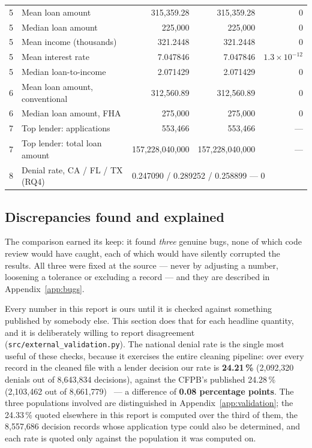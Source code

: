 \documentclass[sigconf,balance=false]{acmart}
\begin{document}
\begin{table}[t]
\begin{tabular}{@{}llrrr@{}}
5 & Mean loan amount                  & 315{,}359.28 & 315{,}359.28 & $0$ \\
5 & Median loan amount                & 225{,}000 & 225{,}000 & $0$ \\
5 & Mean income (thousands)           & 321.2448 & 321.2448 & $0$ \\
5 & Mean interest rate                & 7.047846 & 7.047846 & $1.3{\times}10^{-12}$ \\
5 & Median loan-to-income             & 2.071429 & 2.071429 & $0$ \\
6 & Mean loan amount, conventional    & 312{,}560.89 & 312{,}560.89 & $0$ \\
6 & Median loan amount, FHA           & 275{,}000 & 275{,}000 & $0$ \\
7 & Top lender: applications          & 553{,}466 & 553{,}466 & --- \\
7 & Top lender: total loan amount     & 157{,}228{,}040{,}000 & 157{,}228{,}040{,}000 & --- \\
8 & Denial rate, CA / FL / TX (RQ4)
  & \multicolumn{3}{l}{0.247090 / 0.289252 / 0.258899 --- $0$} \\
\bottomrule
\end{tabular}
\end{table}

\subsection{Discrepancies found and explained}

The comparison earned its keep: it found \emph{three} genuine bugs, none of
which code review would have caught, each of which would have silently
corrupted the results. All three were fixed at the source --- never by
adjusting a number, loosening a tolerance or excluding a record --- and
they are described in Appendix~\ref{app:bugs}.

Every number in this report is ours until it is checked against
something published by somebody else. This section does that for each
headline quantity, and it is deliberately willing to report disagreement
(\texttt{src/external\_\allowbreak validation.py}). The national denial
rate is the single most useful of these checks, because it exercises the
entire cleaning pipeline: over every record in the cleaned file with a
lender decision our rate is \textbf{24.21\,\%} (2{,}092{,}320 denials out
of 8{,}643{,}834 decisions), against the CFPB's published 24.28\,\%
(2{,}103{,}462 out of 8{,}661{,}779)~\cite{cpb} --- a difference of
\textbf{0.08 percentage points}. The three populations involved are
distinguished in Appendix~\ref{app:validation}; the 24.33\,\% quoted
elsewhere in this report is computed over the third of them, the
8{,}557{,}686 decision records whose application type could also be
determined, and each rate is quoted only against the population it was
computed on.
\end{document}
